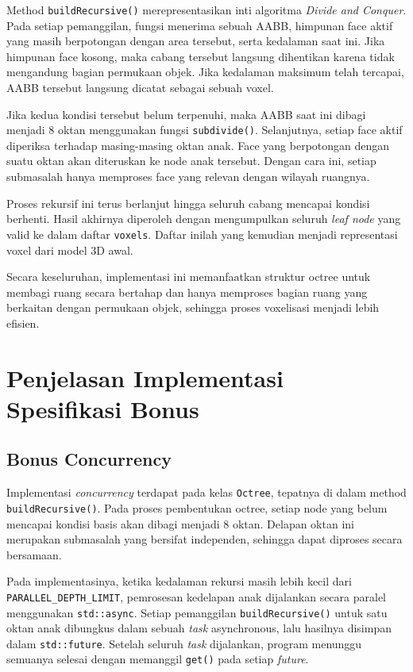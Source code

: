 \documentclass[12pt, a4paper]{report}
\begin{document}
Method \texttt{buildRecursive()} merepresentasikan inti algoritma
\textit{Divide and Conquer}. Pada setiap pemanggilan, fungsi menerima
sebuah AABB, himpunan face aktif yang masih berpotongan dengan area
tersebut, serta kedalaman saat ini. Jika himpunan face kosong, maka
cabang tersebut langsung dihentikan karena tidak mengandung bagian
permukaan objek. Jika kedalaman maksimum telah tercapai, AABB tersebut
langsung dicatat sebagai sebuah voxel.

Jika kedua kondisi tersebut belum terpenuhi, maka AABB saat ini dibagi
menjadi 8 oktan menggunakan fungsi \texttt{subdivide()}. Selanjutnya,
setiap face aktif diperiksa terhadap masing-masing oktan anak. Face yang
berpotongan dengan suatu oktan akan diteruskan ke node anak tersebut.
Dengan cara ini, setiap submasalah hanya memproses face yang relevan
dengan wilayah ruangnya.

Proses rekursif ini terus berlanjut hingga seluruh cabang mencapai kondisi
berhenti. Hasil akhirnya diperoleh dengan mengumpulkan seluruh
\textit{leaf node} yang valid ke dalam daftar \texttt{voxels}. Daftar
inilah yang kemudian menjadi representasi voxel dari model 3D awal.

Secara keseluruhan, implementasi ini memanfaatkan struktur octree untuk
membagi ruang secara bertahap dan hanya memproses bagian ruang yang
berkaitan dengan permukaan objek, sehingga proses voxelisasi menjadi lebih
efisien.

\section{Penjelasan Implementasi Spesifikasi Bonus}

\subsection{Bonus Concurrency}

Implementasi \textit{concurrency} terdapat pada kelas \texttt{Octree},
tepatnya di dalam method \texttt{buildRecursive()}. Pada proses
pembentukan octree, setiap node yang belum mencapai kondisi basis akan
dibagi menjadi 8 oktan. Delapan oktan ini merupakan submasalah yang
bersifat independen, sehingga dapat diproses secara bersamaan.

Pada implementasinya, ketika kedalaman rekursi masih lebih kecil dari
\texttt{PARALLEL\_DEPTH\_LIMIT}, pemrosesan kedelapan anak dijalankan
secara paralel menggunakan \texttt{std::async}. Setiap pemanggilan
\texttt{buildRecursive()} untuk satu oktan anak dibungkus dalam sebuah
\textit{task} asynchronous, lalu hasilnya disimpan dalam
\texttt{std::future}. Setelah seluruh \textit{task} dijalankan, program
menunggu semuanya selesai dengan memanggil \texttt{get()} pada setiap
\textit{future}.
\end{document}
